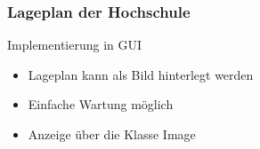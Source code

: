 %
%
%
\begin{frame}
	\frametitle{Lageplan der Hochschule}
%
	\begin{block}{Implementierung in GUI}
		\begin{itemize}
			\item Lageplan kann als Bild hinterlegt werden
			\item Einfache Wartung möglich
			\item Anzeige über die Klasse Image
		\end{itemize}
	\end{block}
\end{frame}
%
%
%

